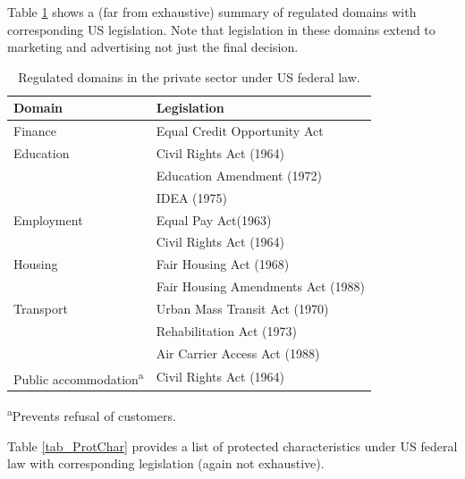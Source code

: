 Table \ref{tab_RegDom} shows a (far from exhaustive) summary of regulated domains with corresponding US legislation. Note that legislation in these domains extend to marketing and advertising not just the final decision.
%
\begin{table}[h!]
{\centering
\caption{Regulated domains in the private sector under US federal law.}
\label{tab_RegDom}
\vspace{10pt}
\begin{tabular}{|l|l|}
\hline
Domain                        & Legislation                        \\
\hline
\hline
Finance                       & Equal Credit Opportunity Act       \\
\hline
Education                     & Civil Rights Act (1964)            \\
                              & Education Amendment (1972)         \\
                              & IDEA (1975)                        \\
\hline
Employment                    & Equal Pay Act(1963)                \\
                              & Civil Rights Act (1964)            \\
\hline
Housing                       & Fair Housing Act (1968)            \\
                              & Fair Housing Amendments Act (1988) \\
\hline
Transport                     & Urban Mass Transit Act (1970)      \\
                              & Rehabilitation Act (1973)          \\
                              & Air Carrier Access Act (1988)      \\
\hline
Public accommodation\textsuperscript{a} & Civil Rights Act (1964)            \\
\hline
\end{tabular}\par}
\vspace{4pt}
\footnotesize
\hspace{1.5em}\textsuperscript{a}Prevents refusal of customers.
\end{table}
%
Table \ref{tab_ProtChar} provides a list of protected characteristics under US federal law with corresponding legislation (again not exhaustive).
%
